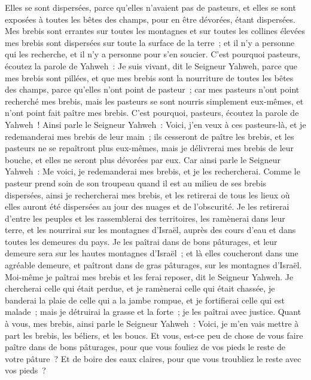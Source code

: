 \begin{multicols}{2}
Elles se sont dispersées, parce qu'elles n'avaient pas de pasteurs, et elles se sont exposées à toutes les bêtes des champs, pour en être dévorées, étant dispersées.
Mes brebis sont errantes sur toutes les montagnes et sur toutes les collines élevées mes brebis sont dispersées sur toute la surface de la terre~; et il n'y a personne qui les recherche, et il n'y a personne pour s'en soucier.
C'est pourquoi pasteurs, écoutez la parole de Yahweh~:
Je suis vivant, dit le Seigneur Yahweh, parce que mes brebis sont pillées, et que mes brebis sont la nourriture de toutes les bêtes des champs, parce qu'elles n'ont point de pasteur~; car mes pasteurs n'ont point recherché mes brebis, mais les pasteurs se sont nourris simplement eux-mêmes, et n'ont point fait paître mes brebis.
C'est pourquoi, pasteurs, écoutez la parole de Yahweh~!
Ainsi parle le Seigneur Yahweh~: Voici, j'en veux à ces pasteurs-là, et je redemanderai mes brebis de leur main~; ils cesseront de paître les brebis, et les pasteurs ne se repaîtront plus eux-mêmes, mais je délivrerai mes brebis de leur bouche, et elles ne seront plus dévorées par eux.
Car ainsi parle le Seigneur Yahweh~: Me voici, je redemanderai mes brebis, et je les rechercherai.
Comme le pasteur prend soin de son troupeau quand il est au milieu de ses brebis dispersées, ainsi je rechercherai mes brebis, et les retirerai de tous les lieux où elles auront été dispersées au jour des nuages et de l'obscurité.
Je les retirerai d'entre les peuples et les rassemblerai des territoires, les ramènerai dans leur terre, et les nourrirai sur les montagnes d'Israël, auprès des cours d'eau et dans toutes les demeures du pays.
Je les paîtrai dans de bons pâturages, et leur demeure sera sur les hautes montagnes d'Israël~; et là elles coucheront dans une agréable demeure, et paîtront dans de gras pâturages, sur les montagnes d'Israël.
Moi-même je paîtrai mes brebis et les ferai reposer, dit le Seigneur Yahweh.
Je chercherai celle qui était perdue, et je ramènerai celle qui était chassée, je banderai la plaie de celle qui a la jambe rompue, et je fortifierai celle qui est malade~; mais je détruirai la grasse et la forte~; je les paîtrai avec justice.
Quant à vous, mes brebis, ainsi parle le Seigneur Yahweh~: Voici, je m'en vais mettre à part les brebis, les béliers, et les boucs.
Et vous, est-ce peu de chose de vous faire paître dans de bons pâturages, pour que vous fouliez de vos pieds le reste de votre pâture~? Et de boire des eaux claires, pour que vous troubliez le reste avec vos pieds~?

\end{multicols}
